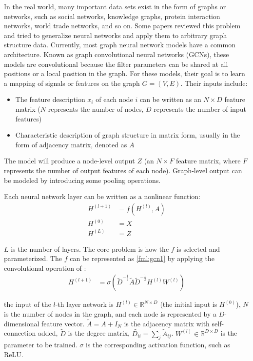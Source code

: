 In the real world, many important data sets exist in the form of graphs or networks, such as social networks, knowledge graphs, protein interaction networks, world trade networks, and so on. Some papers reviewed this problem and tried to generalize neural networks and apply them to arbitrary graph structure data\cite{wu2018socialgcn,dettmers2018convolutional}. Currently, most graph neural network models have a common architecture. Known as graph convolutional neural networks (GCNs), these models are convolutional because the filter parameters can be shared at all positions or a local position in the graph. For these models, their goal is to learn a mapping of signals or features on the graph \(G=(V,E)\). Their inputs include:

\begin{itemize}
	\item The feature description \(x_i\) of each node \(i\) can be written as an \(N\times D\) feature matrix (\(N\) represents the number of nodes, \(D\) represents the number of input features)
	\item Characteristic description of graph structure in matrix form, usually in the form of adjacency matrix, denoted as $A$
\end{itemize}

The model will produce a node-level output \(Z\) (an \(N\times F\) feature matrix, where \(F\) represents the number of output features of each node). Graph-level output can be modeled by introducing some pooling operations.

Each neural network layer can be written as a nonlinear function:
\begin{align}
	H^{(l+1)} & =f(H^{(l)}, A) \\
	H^{(0)}   & =X             \\
	H^{(L)}   & =Z
\end{align}

$L$ is the number of layers. The core problem is how the $f$ is selected and parameterized. The $f$ can be represented as \ref{fml:gcn1} by applying the convolutional operation of \cite{kipf2016semi}:
\begin{align}
	H^{(l+1)} & =\sigma(\tilde{D}^{-\frac{1}{2}} \tilde{A} \tilde{D}^{-\frac{1}{2}} H^{(l)} W^{(l)})\label{fml:gcn1}
\end{align}

the input of the $l$-th layer network is \(H^{(l)}\in \mathbb{R}^{N\times D}\) (the initial input is \(H^{(0)}\)), \(N\) is the number of nodes in the graph, and each node is represented by a \(D\)-dimensional feature vector. \(\tilde{A}=A+I_N\) is the adjacency matrix with self-connection added, \(\tilde{D}\) is the degree matrix, \(\tilde{D_{ii}}=\sum_{j}{\tilde{A}_{ij}}\). \(W^{(l)}\in \mathbb{R}^{D\times D}\) is the parameter to be trained. \(\sigma \) is the corresponding activation function, such as ReLU.


